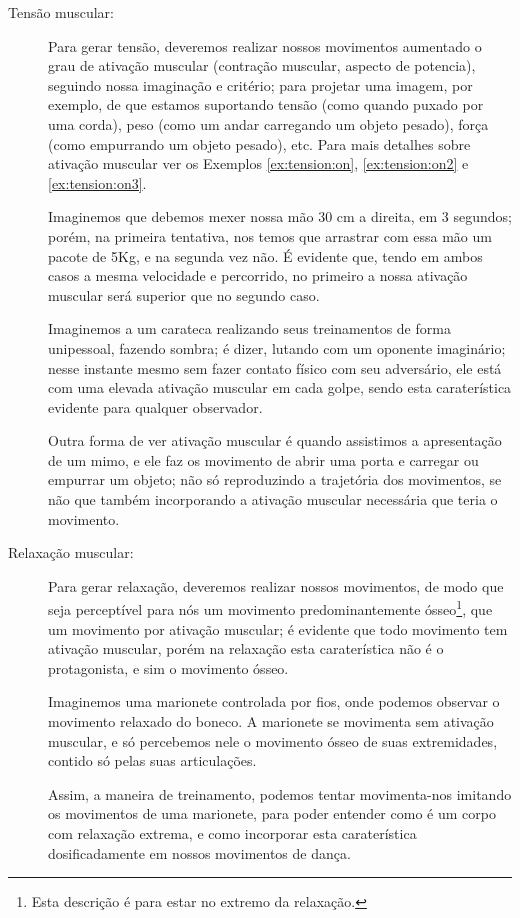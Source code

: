 \begin{description}
\item[Tensão muscular:] Para gerar tensão, 
deveremos realizar nossos movimentos aumentado o grau de ativação muscular (contração muscular, aspecto de potencia), 
seguindo nossa imaginação e  critério;
para projetar uma imagem, por exemplo, de que estamos suportando tensão (como quando puxado por uma corda), 
peso (como um andar carregando um objeto pesado), força (como empurrando um objeto pesado), etc.
Para mais detalhes sobre ativação muscular ver os  Exemplos \ref{ex:tension:on}, \ref{ex:tension:on2} e \ref{ex:tension:on3}.
\begin{example}
\label{ex:tension:on}
Imaginemos que debemos mexer nossa mão 30 cm a direita, em 3 segundos;
porém, na primeira tentativa, nos temos que arrastrar com essa mão um pacote de 5Kg,
e na segunda vez não.
É evidente que, tendo em ambos casos a mesma velocidade e percorrido,
no primeiro a nossa ativação muscular será superior que no segundo caso.
\end{example}
\begin{example}
\label{ex:tension:on2}
Imaginemos a um carateca realizando seus treinamentos de forma unipessoal, 
fazendo sombra; é dizer, lutando com um oponente imaginário;
nesse instante mesmo sem fazer contato físico com seu adversário,
ele está com uma elevada ativação muscular em cada golpe,
sendo esta caraterística evidente para qualquer  observador.
\end{example}
\begin{example}
\label{ex:tension:on3}
Outra forma de ver ativação muscular é quando assistimos a apresentação de um mimo,
e ele faz os movimento de  abrir uma porta e carregar ou empurrar um objeto;
não só reproduzindo a trajetória dos movimentos, 
se não que também incorporando a ativação muscular necessária que teria o movimento. 
\end{example}
\item[Relaxação muscular:] Para gerar relaxação, 
deveremos realizar nossos movimentos, 
de modo que seja  perceptível para nós um movimento predominantemente ósseo\footnote{Esta
descrição é para estar no extremo da relaxação.}, 
que um movimento por ativação muscular;
é evidente que todo movimento tem ativação muscular,
porém na relaxação esta caraterística não é o protagonista,
e sim o movimento ósseo.
\begin{example}
Imaginemos uma marionete controlada por fios, 
onde podemos observar o movimento relaxado do boneco.
A marionete se movimenta sem ativação muscular, 
e só percebemos nele o movimento ósseo de suas extremidades, 
contido só pelas suas articulações.

Assim, a maneira de treinamento, 
podemos tentar movimenta-nos imitando os movimentos de uma marionete,
para poder entender como é um corpo com relaxação extrema,
e como incorporar esta caraterística dosificadamente em nossos movimentos de dança.
\end{example} 
\end{description}

